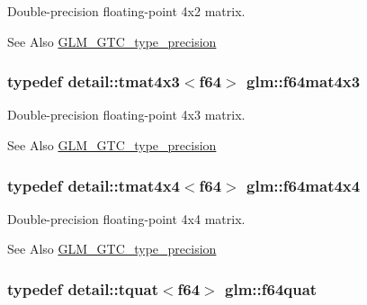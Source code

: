 Double-\/precision floating-\/point 4x2 matrix. 

\begin{DoxySeeAlso}{See Also}
\hyperlink{group__gtc__type__precision}{G\-L\-M\-\_\-\-G\-T\-C\-\_\-type\-\_\-precision} 
\end{DoxySeeAlso}
\hypertarget{group__gtc__type__precision_gaa24e152ef6e17be752c350e495c879de}{
\subsubsection[{f64mat4x3}]{\setlength{\rightskip}{0pt plus 5cm}typedef detail\-::tmat4x3$<$f64$>$ {\bf glm\-::f64mat4x3}}}\label{group__gtc__type__precision_gaa24e152ef6e17be752c350e495c879de}


Double-\/precision floating-\/point 4x3 matrix. 

\begin{DoxySeeAlso}{See Also}
\hyperlink{group__gtc__type__precision}{G\-L\-M\-\_\-\-G\-T\-C\-\_\-type\-\_\-precision} 
\end{DoxySeeAlso}
\hypertarget{group__gtc__type__precision_ga8f54fb7f48ddf13b3dea075ae89baa78}{
\subsubsection[{f64mat4x4}]{\setlength{\rightskip}{0pt plus 5cm}typedef detail\-::tmat4x4$<$f64$>$ {\bf glm\-::f64mat4x4}}}\label{group__gtc__type__precision_ga8f54fb7f48ddf13b3dea075ae89baa78}


Double-\/precision floating-\/point 4x4 matrix. 

\begin{DoxySeeAlso}{See Also}
\hyperlink{group__gtc__type__precision}{G\-L\-M\-\_\-\-G\-T\-C\-\_\-type\-\_\-precision} 
\end{DoxySeeAlso}
\hypertarget{group__gtc__type__precision_ga61f850d473c8569fcc124bdeed386f57}{
\subsubsection[{f64quat}]{\setlength{\rightskip}{0pt plus 5cm}typedef detail\-::tquat$<$f64$>$ {\bf glm\-::f64quat}}}\label{group__gtc__type__precision_ga61f850d473c8569fcc124bdeed386f57}


